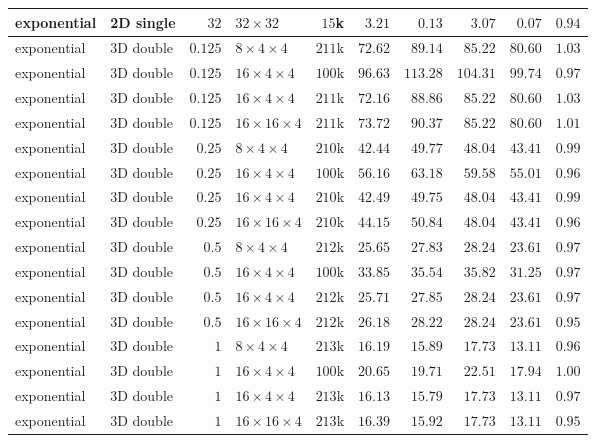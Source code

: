 {\begin{longtable}{llrlrrrrrr}
    exponential & 2D single & $32$ & $32{\times}32$ & $15$k & $3.21$ & $0.13$ & $3.07$ & $0.07$ & $0.94$ \\
    \midrule
    exponential & 3D double & $0.125$ & $8{\times}4{\times}4$ & $211$k & $72.62$ & $89.14$ & $85.22$ & $80.60$ & $1.03$ \\
    exponential & 3D double & $0.125$ & $16{\times}4{\times}4$ & $100$k & $96.63$ & $113.28$ & $104.31$ & $99.74$ & $0.97$ \\
    exponential & 3D double & $0.125$ & $16{\times}4{\times}4$ & $211$k & $72.16$ & $88.86$ & $85.22$ & $80.60$ & $1.03$ \\
    exponential & 3D double & $0.125$ & $16{\times}16{\times}4$ & $211$k & $73.72$ & $90.37$ & $85.22$ & $80.60$ & $1.01$ \\
    exponential & 3D double & $0.25$ & $8{\times}4{\times}4$ & $210$k & $42.44$ & $49.77$ & $48.04$ & $43.41$ & $0.99$ \\
    exponential & 3D double & $0.25$ & $16{\times}4{\times}4$ & $100$k & $56.16$ & $63.18$ & $59.58$ & $55.01$ & $0.96$ \\
    exponential & 3D double & $0.25$ & $16{\times}4{\times}4$ & $210$k & $42.49$ & $49.75$ & $48.04$ & $43.41$ & $0.99$ \\
    exponential & 3D double & $0.25$ & $16{\times}16{\times}4$ & $210$k & $44.15$ & $50.84$ & $48.04$ & $43.41$ & $0.96$ \\
    exponential & 3D double & $0.5$ & $8{\times}4{\times}4$ & $212$k & $25.65$ & $27.83$ & $28.24$ & $23.61$ & $0.97$ \\
    exponential & 3D double & $0.5$ & $16{\times}4{\times}4$ & $100$k & $33.85$ & $35.54$ & $35.82$ & $31.25$ & $0.97$ \\
    exponential & 3D double & $0.5$ & $16{\times}4{\times}4$ & $212$k & $25.71$ & $27.85$ & $28.24$ & $23.61$ & $0.97$ \\
    exponential & 3D double & $0.5$ & $16{\times}16{\times}4$ & $212$k & $26.18$ & $28.22$ & $28.24$ & $23.61$ & $0.95$ \\
    exponential & 3D double & $1$ & $8{\times}4{\times}4$ & $213$k & $16.19$ & $15.89$ & $17.73$ & $13.11$ & $0.96$ \\
    exponential & 3D double & $1$ & $16{\times}4{\times}4$ & $100$k & $20.65$ & $19.71$ & $22.51$ & $17.94$ & $1.00$ \\
    exponential & 3D double & $1$ & $16{\times}4{\times}4$ & $213$k & $16.13$ & $15.79$ & $17.73$ & $13.11$ & $0.97$ \\
    exponential & 3D double & $1$ & $16{\times}16{\times}4$ & $213$k & $16.39$ & $15.92$ & $17.73$ & $13.11$ & $0.95$ \\

\end{longtable}}
